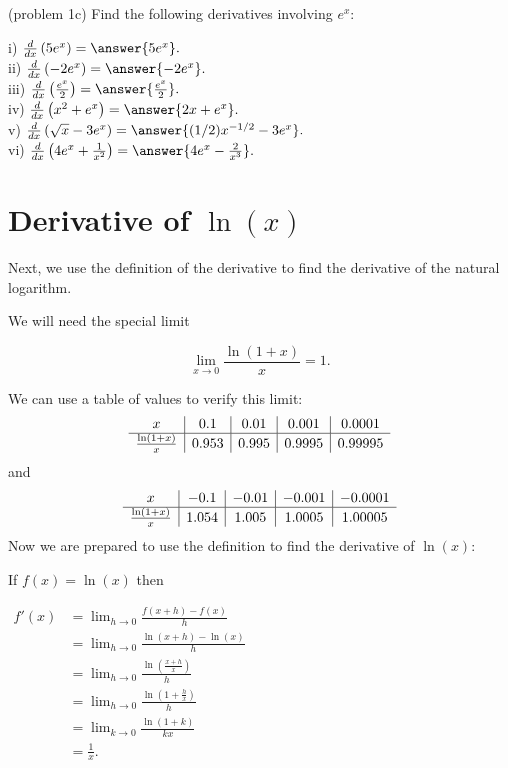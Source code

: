 \documentclass[handout]{ximera}
\begin{document}
\begin{problem}(problem 1c)
Find the following derivatives involving $e^x$:

i) $\frac{d}{dx} \left(5e^x\right) = \answer{5e^x}.$\\
ii) $\frac{d}{dx} \left(-2e^x\right) = \answer{-2e^x}.$\\
iii) $\frac{d}{dx} \left(\frac{e^x}{2}\right) = \answer{\frac{e^x}{2}}.$\\
iv) $\frac{d}{dx} \left(x^2 + e^x\right) = \answer{2x + e^x}.$\\
v) $\frac{d}{dx} \left(\sqrt x - 3e^x\right) = \answer{(1/2)x^{-1/2} - 3e^x}.$\\
vi) $\frac{d}{dx} \left(4e^x + \frac{1}{x^2}\right) = \answer{4e^x -\frac{2}{x^3}}.$


\end{problem}



\section{Derivative of $\ln(x)$}


Next, we use the definition of the derivative to find the derivative of the natural logarithm.



We will need the special limit 

\[
\lim_{x \to 0} \frac{\ln(1 + x)}{x} = 1.
\]

We can use a table of values to verify this limit:
\[
\begin{array}{ c | c | c | c | c }
  x & 0.1 & 0.01  & 0.001 & 0.0001 \\ 
	\hline
	 \frac{\ln(1+x)}{x} & 0.953 & 0.995 & 0.9995 & 0.99995
\end{array}
\]
and
\[
\begin{array}{ c | c | c | c | c }
  x & -0.1 & -0.01  & -0.001 & -0.0001 \\ 
	\hline
	 \frac{\ln(1+x)}{x} & 1.054 & 1.005 & 1.0005 & 1.00005
\end{array}
\]
Now we are prepared to use the definition to find the derivative of $\ln(x)$:

If $f(x) = \ln(x)$ then\\[10pt]
\begin{center}
$\begin{aligned}
f'(x) &= \lim_{h \to 0} \frac{f(x+h)-f(x)}{h}\\[5pt]
&= \lim_{h \to 0}\frac{\ln(x+h)-\ln(x)}{h}\\[5pt]
&= \lim_{h \to 0} \frac{\ln(\frac{x+h}{x})}{h}\\[5pt]
&= \lim_{h \to 0}\frac{\ln(1 + \frac{h}{x})}{h}\\[5pt]
&= \lim_{k \to 0} \frac{\ln(1 + k)}{kx} \\[5pt]
&= \frac{1}{x}.
\end{aligned}$
\end{center}
\end{document}
